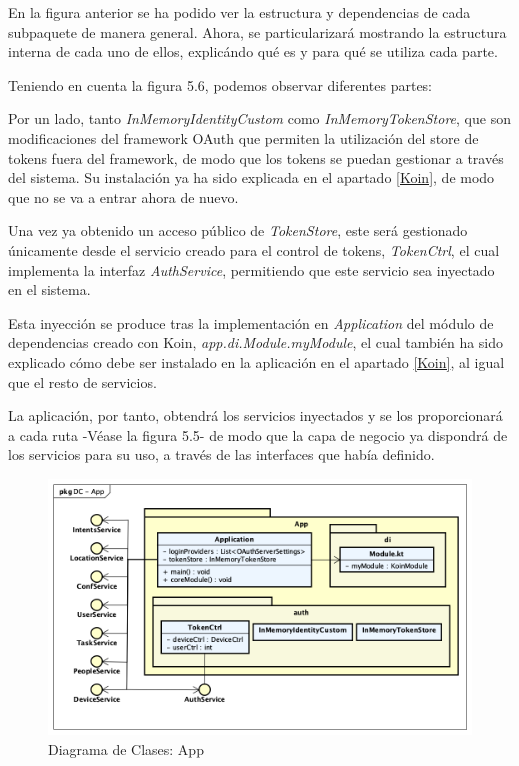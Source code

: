     En la figura anterior se ha podido ver la estructura y dependencias de cada subpaquete de manera general.
    Ahora, se particularizará mostrando la estructura interna de cada uno de ellos, explicándo qué es y para qué se utiliza cada parte.
    
    Teniendo en cuenta la figura 5.6, podemos observar diferentes partes:
    
    Por un lado, tanto \textit{InMemoryIdentityCustom} como  \textit{InMemoryTokenStore}, que son modificaciones del framework OAuth que permiten la utilización del store de tokens fuera del framework, de modo que los tokens se puedan gestionar a través del sistema. Su instalación ya ha sido explicada en el apartado \ref{Koin}, de modo que no se va a entrar ahora de nuevo.
    
    Una vez ya obtenido un acceso público de \textit{TokenStore}, este será gestionado únicamente desde el servicio creado para el control de tokens, \textit{TokenCtrl}, el cual implementa la interfaz \textit{AuthService}, permitiendo que este servicio sea inyectado en el sistema.
    
    Esta inyección se produce tras la implementación en \textit{Application} del módulo de dependencias creado con Koin, \textit{app.di.Module.myModule}, el cual también ha sido explicado cómo debe ser instalado en la aplicación en el apartado \ref{Koin}, al igual que el resto de servicios.
    
    La aplicación, por tanto, obtendrá los servicios inyectados y se los proporcionará a cada ruta -Véase la figura 5.5- de modo que la capa de negocio ya dispondrá de los servicios para su uso, a través de las interfaces que había definido.

    \begin{figure}[H]
        \centering
        \includegraphics[width=14cm]{./img/arch/back/dc.app.png}
        \caption{Diagrama de Clases: App}
        \label{fig:dc.app}
    \end{figure}

